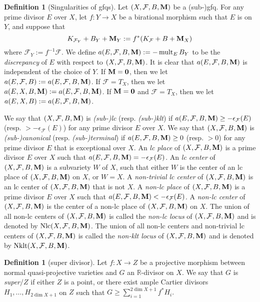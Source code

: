\documentclass[11pt]{amsart}
\numberwithin{equation}{section}
\newcommand{\Mm}{{\bf{M}}}
\newcommand{\Rr}{\mathbb{R}}
\newcommand{\Nklt}{\operatorname{Nklt}}
\newcommand{\Nlc}{\operatorname{Nlc}}
\newcommand{\mult}{\operatorname{mult}}
\newcommand{\Ff}{\mathcal{F}}
\theoremstyle{definition}
\newtheorem{defn}[thm]{Definition}
\theoremstyle{definition}
\theoremstyle{definition}
\begin{document}
\begin{defn}[Singularities of gfqs]\label{defn: gfq singularity}
Let $(X,\Ff,B,\Mm)$ be a (sub-)gfq. For any prime divisor $E$ over $X$, let $f: Y\rightarrow X$ be a birational morphism such that $E$ is on $Y$, and suppose that
$$K_{\Ff_Y}+B_Y+\Mm_Y:=f^*(K_\Ff+B+\Mm_X)$$
where $\Ff_Y:=f^{-1}\Ff$. We define $a(E,\Ff,B,\Mm):=-\mult_EB_Y$ to be the \emph{discrepancy} of $E$ with respect to $(X,\Ff,B,\Mm)$. It is clear that $a(E,\Ff,B,\Mm)$ is independent of the choice of $Y$. If $\Mm=\bm{0}$, then we let $a(E,\Ff,B):=a(E,\Ff,B,\Mm)$. If $\Ff=T_X$, then we let $a(E,X,B,\Mm):=a(E,\Ff,B,\Mm)$. If $\Mm=\bm{0}$ and $\Ff=T_X$, then we let $a(E,X,B):=a(E,\Ff,B,\Mm)$.

We say that $(X,\Ff,B,\Mm)$ is \emph{(sub-)lc} (resp. \emph{(sub-)klt}) if $a(E,\Ff,B,\Mm)\geq -\epsilon_{\Ff}(E)$ (resp. $>-\epsilon_{\Ff}(E)$) for any prime divisor $E$ over $X$. We say that $(X,\Ff,B,\Mm)$ is \emph{(sub-)canonical} (resp. \emph{(sub-)terminal}) if $a(E,\Ff,B,\Mm)\geq 0$ (resp. $>0$) for any prime divisor $E$ that is exceptional over $X$. An \emph{lc place} of $(X,\Ff,B,\Mm)$ is a prime divisor $E$ over $X$ such that $a(E,\Ff,B,\Mm)=-\epsilon_{\Ff}(E)$. An \emph{lc center} of $(X,\Ff,B,\Mm)$ is a subvariety $W$ of $X$, such that either $W$ is the center of an lc place of $(X,\Ff,B,\Mm)$ on $X$, or $W=X$. A \emph{non-trivial lc center} of $(X,\Ff,B,\Mm)$ is an lc center of $(X,\Ff,B,\Mm)$ that is not $X$. A \emph{non-lc place} of $(X,\Ff,B,\Mm)$ is a prime divisor $E$ over $X$ such that $a(E,\Ff,B,\Mm)<-\epsilon_{\Ff}(E)$. A \emph{non-lc center} of $(X,\Ff,B,\Mm)$ is the center of a non-lc place of $(X,\Ff,B,\Mm)$ on $X$. The union of all non-lc centers of $(X,\Ff,B,\Mm)$ is called the \emph{non-lc locus} of $(X,\Ff,B,\Mm)$ and is denoted by $\Nlc(X,\Ff,B,\Mm)$. The union of all non-lc centers and non-trivial lc centers of $(X,\Ff,B,\Mm)$ is called the \emph{non-klt locus} of $(X,\Ff,B,\Mm)$ and is denoted by $\Nklt(X,\Ff,B,\Mm)$.
\end{defn}

\begin{defn}[super divisor]
Let $f: X\rightarrow Z$ be a projective morphism between normal quasi-projective varieties and $G$ an $\Rr$-divisor on $X$. We say that $G$ is \emph{super$/Z$} if either $Z$ is a point, or there exist ample Cartier divisors $H_1,\dots,H_{2\dim X+1}$ on $Z$ such that $G\geq\sum_{i=1}^{2\dim X+1}f^*H_i.$
\end{defn}
\end{document}
